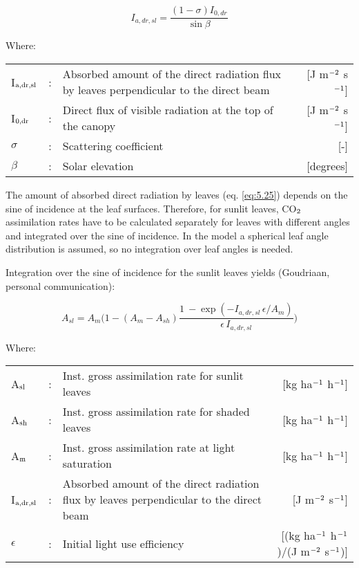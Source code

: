 \begin{equation}
\label{eq:5.25}
I_{a,dr,sl} = {\frac{(1-\sigma) I_{0,dr}}{\sin \beta }}
\end{equation}

Where:\\[5pt]
\begin{tabularx}{\textwidth}{llXr}
	I$_{{\rm a,dr,sl}}$ &:& Absorbed amount of the direct radiation flux by leaves
	perpendicular to the direct beam    &    [J m$^{{\rm -2}}$ s$^{{\rm -1}}$]\\
	I$_{{\rm 0,dr}}$ &:& Direct flux of visible radiation at the top of 
	the canopy &  [J m$^{{\rm -2}}$ s$^{{\rm -1}}$]\\
	$\sigma$ &:& Scattering coefficient  &[-]\\
	$\beta$ &:& Solar elevation   & [degrees]\\
\end{tabularx}

The amount of absorbed direct radiation by leaves (eq. \ref{eq:5.25}) depends on the sine of
incidence at the leaf surfaces. Therefore, for sunlit leaves, CO$_{{\rm 2}}$ assimilation rates have to
be calculated separately for leaves with different angles and integrated over the sine of
incidence. In the model a spherical leaf angle distribution is assumed, so no integration
over leaf angles is needed.

Integration over the sine of incidence for the sunlit leaves yields (Goudriaan, personal
communication):

\begin{equation}
A_{sl} = A_{m} \bigg( 
1-(A_{m} - A_{sh})  {\frac{1~- \exp({{-I _{a,dr,sl} \, \epsilon}}/{A_m}) }
	{\epsilon\, I _{a,dr,sl} }}
\bigg)
\end{equation}

Where:\\[5pt]
\begin{tabularx}{\textwidth}{llXr}
	A$_{{\rm sl}}$ &:& Inst. gross assimilation rate for sunlit leaves  &
	[kg ha$^{{\rm -1}}$ h$^{{\rm -1}}$]\\
	A$_{{\rm sh}}$ &:& Inst. gross assimilation rate for shaded leaves  &
	[kg ha$^{{\rm -1}}$ h$^{{\rm -1}}$]\\
	A$_{{\rm m}}$ &:& Inst. gross assimilation rate at light saturation &
	[kg ha$^{{\rm -1}}$ h$^{{\rm -1}}$]\\
	I$_{{\rm a,dr,sl}}$ &:& Absorbed amount of the direct radiation flux by leaves
	perpendicular to the direct beam  &  [J m$^{{\rm -2}}$ s$^{{\rm -1}}$]\\
	$\epsilon$ &:& Initial light use efficiency  &   [(kg ha$^{{\rm -1}}$ 
	h$^{{\rm -1}}$)/(J m$^{{\rm -2}}$ s$^{{\rm -1}}$)]\\
\end{tabularx}

